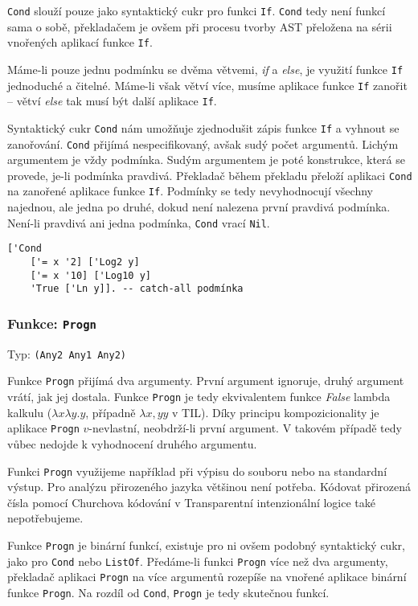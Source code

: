 \lstinline{Cond} slouží pouze jako syntaktický cukr pro funkci \lstinline{If}. \lstinline{Cond} tedy
není funkcí sama o sobě, překladačem je ovšem při procesu tvorby AST přeložena na sérii vnořených
aplikací funkce \lstinline{If}.

Máme-li pouze jednu podmínku se dvěma větvemi, \textit{if} a \textit{else}, je využití funkce
\lstinline{If} jednoduché a čitelné. Máme-li však větví více, musíme aplikace funkce \lstinline{If}
zanořit -- větví \textit{else} tak musí být další aplikace \lstinline{If}.

Syntaktický cukr \lstinline{Cond} nám umožňuje zjednodušit zápis funkce \lstinline{If} a vyhnout
se zanořování. \lstinline{Cond} přijímá nespecifikovaný, avšak sudý počet argumentů. Lichým
argumentem je vždy podmínka. Sudým argumentem je poté konstrukce, která se provede, je-li podmínka
pravdivá. Překladač během překladu přeloží aplikaci \lstinline{Cond} na zanořené aplikace funkce
\lstinline{If}. Podmínky se tedy nevyhodnocují všechny najednou, ale jedna po druhé, dokud není
nalezena první pravdivá podmínka. Není-li pravdivá ani jedna podmínka, \lstinline{Cond} vrací
\lstinline{Nil}.

\begin{lstlisting}[caption={Ukázka využití Cond}]
['Cond
    ['= x '2] ['Log2 y]
    ['= x '10] ['Log10 y]
    'True ['Ln y]]. -- catch-all podmínka
\end{lstlisting}

\subsubsection*{Funkce: \lstinline{Progn}}\label{progn-fn}
Typ: \lstinline{(Any2 Any1 Any2)}

Funkce \lstinline{Progn} přijímá dva argumenty. První argument ignoruje, druhý argument vrátí, jak
jej dostala. Funkce \lstinline{Progn} je tedy ekvivalentem funkce \textit{False} lambda kalkulu
($\lambda x \lambda y . y$, případně $\lambda x, y y$ v TIL). Díky principu kompozicionality je aplikace
\lstinline{Progn} $v$-nevlastní, neobdrží-li první argument. V takovém případě tedy vůbec nedojde
k vyhodnocení druhého argumentu.

Funkci \lstinline{Progn} využijeme například při výpisu do souboru nebo na standardní výstup.
Pro analýzu přirozeného jazyka většinou není potřeba. Kódovat přirozená čísla pomocí Churchova
kódování v Transparentní intenzionální logice také nepotřebujeme.

Funkce \lstinline{Progn} je binární funkcí, existuje pro ni ovšem podobný syntaktický cukr, jako pro
\lstinline{Cond} nebo \lstinline{ListOf}. Předáme-li funkci \lstinline{Progn} více než dva
argumenty, překladač aplikaci \lstinline{Progn} na více argumentů rozepíše na vnořené aplikace
binární funkce \lstinline{Progn}. Na rozdíl od \lstinline{Cond}, \lstinline{Progn} je tedy
skutečnou funkcí.


